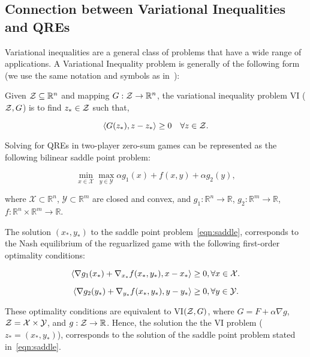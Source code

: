 \subsection{Connection between Variational Inequalities and QREs}

Variational inequalities are a general class of problems that have a wide range of applications.
A Variational Inequality problem is generally of the following form (we use the same notation and
symbols as in~\cite{sokotaUnified2023}):

\begin{definition}
	Given $\mathcal{Z}
		\subseteq \mathbb{R}^n$ and mapping $G: \mathcal{Z} \rightarrow \mathbb{R}^n$, the variational inequality problem VI
	($\mathcal{Z}, G$) is to find $z_{\ast} \in \mathcal{Z}$ such that,

	\[ \langle G(z_{\ast}),
		z - z_{\ast} \rangle \geq 0 \quad \forall z \in \mathcal{Z}.
	\]
\end{definition}


Solving for QREs in two-player zero-sum games can be represented as the following bilinear saddle
point problem:

\begin{equation}
	\label{eqn:saddle} \min_{x \in \mathcal{X}}
	\max_{y \in \mathcal{Y}} \alpha g_1(x) + f(x, y) + \alpha g_2(y),
\end{equation}

where $\mathcal{X} \subset \mathbb{R}^n$, $\mathcal{Y} \subset \mathbb{R}^m$
are closed and convex, and $g_1: \mathbb{R}^n \rightarrow \mathbb{R}$, $g_2: \mathbb{R}^m
	\rightarrow \mathbb{R}$, $f : \mathbb{R}^n \times \mathbb{R}^m \rightarrow \mathbb{R}$.

The solution $(x_{\ast}, y_{\ast})$ to the saddle point problem~\ref{eqn:saddle}, corresponds to
the Nash equilibrium of the reguarlized game with the following first-order optimality conditions:

\begin{equation}
	\label{eqn:optcon1} \langle \nabla g_1(x_*) + \nabla_{x_*}
	f(x_*, y_*), x - x_* \rangle \geq 0, \forall x \in \mathcal{X}.
\end{equation}

\begin{equation}
	\label{eqn:optcon2}
	\langle \nabla g_2(y_*) + \nabla_{y_*} f(x_*, y_*),
	y - y_* \rangle \geq 0, \forall y \in \mathcal{Y}.
\end{equation}

These optimality conditions are equivalent to VI$(\mathcal{Z}, G)$, where $G = F + \alpha \nabla g$,
$\mathcal{Z} = \mathcal{X} \times \mathcal{Y}$, and $g: \mathcal{Z} \rightarrow \mathbb{R}$.
Hence, the solution the the VI problem ($z_{\ast}= (x_{\ast}, y_{\ast})$), corresponds to the
solution of the saddle point problem stated in~\ref{eqn:saddle}.

